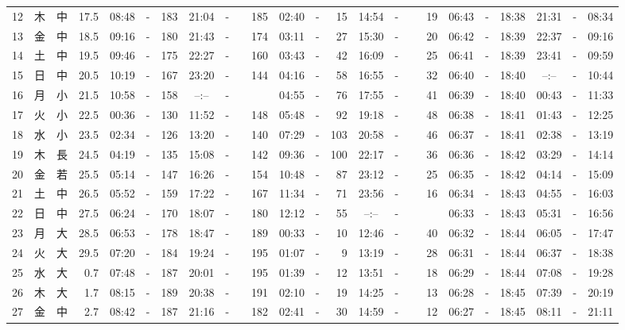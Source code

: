 \documentclass[12pt,a4j]{jsarticle}
\begin{document}
\begin{table}[htbp]
\begin{center}
{\begin{tabular}{|rc|cr|ccrccr|ccrccr|ccc|ccc|}
12 & 木 & 中 & 17.5 &  08:48 &-& 183 &  21:04 &-& 185 &  02:40 &-&  15 &  14:54 &-&  19 & 06:43 & -& 18:38 & 21:31 & -& 08:34 \\
13 & 金 & 中 & 18.5 &  09:16 &-& 180 &  21:43 &-& 174 &  03:11 &-&  27 &  15:30 &-&  20 & 06:42 & -& 18:39 & 22:37 & -& 09:16 \\
14 & 土 & 中 & 19.5 &  09:46 &-& 175 &  22:27 &-& 160 &  03:43 &-&  42 &  16:09 &-&  25 & 06:41 & -& 18:39 & 23:41 & -& 09:59 \\
15 & 日 & 中 & 20.5 &  10:19 &-& 167 &  23:20 &-& 144 &  04:16 &-&  58 &  16:55 &-&  32 & 06:40 & -& 18:40 & --:-- & -& 10:44 \\
16 & 月 & 小 & 21.5 &  10:58 &-& 158 &  --:-- &-&~~~~~ &  04:55 &-&  76 &  17:55 &-&  41 & 06:39 & -& 18:40 & 00:43 & -& 11:33 \\
17 & 火 & 小 & 22.5 &  00:36 &-& 130 &  11:52 &-& 148 &  05:48 &-&  92 &  19:18 &-&  48 & 06:38 & -& 18:41 & 01:43 & -& 12:25 \\
18 & 水 & 小 & 23.5 &  02:34 &-& 126 &  13:20 &-& 140 &  07:29 &-& 103 &  20:58 &-&  46 & 06:37 & -& 18:41 & 02:38 & -& 13:19 \\
19 & 木 & 長 & 24.5 &  04:19 &-& 135 &  15:08 &-& 142 &  09:36 &-& 100 &  22:17 &-&  36 & 06:36 & -& 18:42 & 03:29 & -& 14:14 \\
20 & 金 & 若 & 25.5 &  05:14 &-& 147 &  16:26 &-& 154 &  10:48 &-&  87 &  23:12 &-&  25 & 06:35 & -& 18:42 & 04:14 & -& 15:09 \\
21 & 土 & 中 & 26.5 &  05:52 &-& 159 &  17:22 &-& 167 &  11:34 &-&  71 &  23:56 &-&  16 & 06:34 & -& 18:43 & 04:55 & -& 16:03 \\
22 & 日 & 中 & 27.5 &  06:24 &-& 170 &  18:07 &-& 180 &  12:12 &-&  55 &  --:-- &-&~~~~~ & 06:33 & -& 18:43 & 05:31 & -& 16:56 \\
23 & 月 & 大 & 28.5 &  06:53 &-& 178 &  18:47 &-& 189 &  00:33 &-&  10 &  12:46 &-&  40 & 06:32 & -& 18:44 & 06:05 & -& 17:47 \\
24 & 火 & 大 & 29.5 &  07:20 &-& 184 &  19:24 &-& 195 &  01:07 &-&   9 &  13:19 &-&  28 & 06:31 & -& 18:44 & 06:37 & -& 18:38 \\
25 & 水 & 大 &  0.7 &  07:48 &-& 187 &  20:01 &-& 195 &  01:39 &-&  12 &  13:51 &-&  18 & 06:29 & -& 18:44 & 07:08 & -& 19:28 \\
26 & 木 & 大 &  1.7 &  08:15 &-& 189 &  20:38 &-& 191 &  02:10 &-&  19 &  14:25 &-&  13 & 06:28 & -& 18:45 & 07:39 & -& 20:19 \\
27 & 金 & 中 &  2.7 &  08:42 &-& 187 &  21:16 &-& 182 &  02:41 &-&  30 &  14:59 &-&  12 & 06:27 & -& 18:45 & 08:11 & -& 21:11 \\

\end{tabular}}
\end{center}
\end{table}
\end{document}
